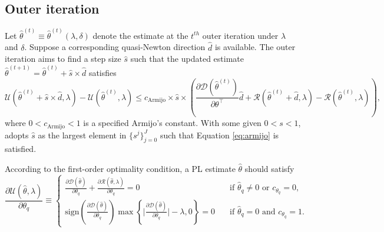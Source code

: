 \documentclass[nojss]{jss}
\begin{document}
\subsection{Outer iteration}
Let $\hat{\theta}^{(t)} \equiv \hat{\theta}^{(t)}(\lambda,\delta)$ denote the estimate at the $t^{th}$ outer iteration under $\lambda$ and $\delta$. Suppose a corresponding quasi-Newton direction $\hat{d}$ is available. The outer iteration aims to find a step size $\hat{s}$ such that the updated estimate $\hat{\theta}^{(t+1)}=\hat{\theta}^{(t)}+ \hat{s} \times \hat{d}$ satisfies
%
\begin{equation} \label{eq:armijo}
\mathcal{U}(\hat{\theta}^{(t)}+\hat{s} \times \hat{d}, \lambda) - \mathcal{U}(\hat{\theta}^{(t)}, \lambda) \leq c_{\mathrm{Armijo}} \times \hat{s} \times \left( 
\frac{\partial \mathcal{D}(\hat{\theta}^{(t)})}{\partial \theta^\top} \hat{d} + 
\mathcal{R}(\hat{\theta}^{(t)}+\hat{d},\lambda) - \mathcal{R}(\hat{\theta}^{(t)},\lambda)
\right),
\end{equation}
%
where $0<c_{\mathrm{Armijo}}<1$ is a specified Armijo's constant. With some given $0<s<1$,  adopts $\hat{s}$ as the largest element in $\{s^j\}_{j=0}^J$ such that Equation \ref{eq:armijo} is satisfied. 

According to the first-order optimality condition, a PL estimate $\hat{\theta}$ should satisfy
%
\begin{equation} \label{eq:optimality}
\frac{\partial \mathcal{U}(\hat{\theta}, \lambda)}{\partial \theta_q} \equiv
  \begin{cases}
  \frac{\partial \mathcal{D}(\hat{\theta})}{\partial \theta_q} + \frac{\partial \mathcal{R}(\hat{\theta}, \lambda)}{\partial \theta_q}=0 & \quad \text{if }\hat{\theta}_q \neq 0 \text{ or } c_{\theta_q}=0, \\
    \mathrm{sign}(\frac{\partial \mathcal{D}(\hat{\theta})}{\partial \theta_q}) \max \left\{ \big |\frac{\partial \mathcal{D}(\hat{\theta})}{\partial \theta_q} \big | - \lambda, 0 \right\}=0 & \quad \text{if }\hat{\theta}_q = 0 \text{ and } c_{\theta_q}=1. 
  \end{cases}
\end{equation}
%
\end{document}
